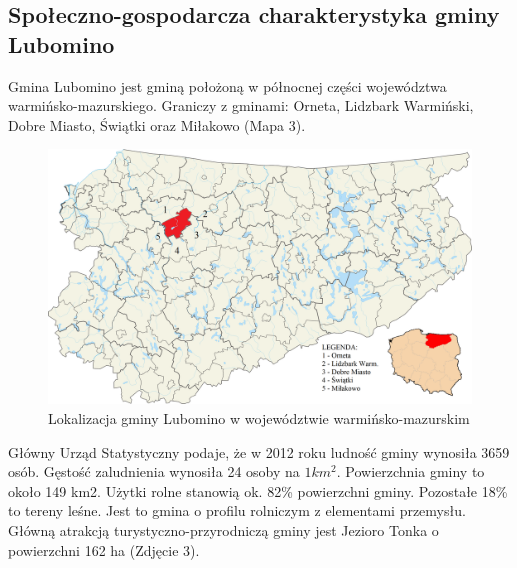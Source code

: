 \documentclass[a4paper,10pt]{article}
\begin{document}
  \subsection{Społeczno-gospodarcza charakterystyka gminy Lubomino}
    Gmina Lubomino jest gminą położoną w północnej części województwa warmińsko-mazurskiego. 
    Graniczy z gminami: Orneta, Lidzbark Warmiński, Dobre Miasto, Świątki oraz Miłakowo (Mapa 3).
    
    \begin{figure}[!htb]
    \centering
	\includegraphics[scale=0.12]{pics/mapa3.png}
	\caption{Lokalizacja gminy Lubomino w województwie warmińsko-mazurskim}
    \end{figure}
    Główny Urząd Statystyczny podaje, że w 2012 roku ludność gminy wynosiła 3659 osób. Gęstość zaludnienia wynosiła 24 osoby na $1 km^{2}$.
    Powierzchnia gminy to około 149 km2. Użytki rolne stanowią ok. 82\% powierzchni gminy. Pozostałe 18\% to tereny leśne. 
    Jest to gmina o profilu rolniczym z elementami przemysłu.
    Główną atrakcją turystyczno-przyrodniczą gminy jest Jezioro Tonka o powierzchni 162 ha (Zdjęcie 3).
    
\end{document}
